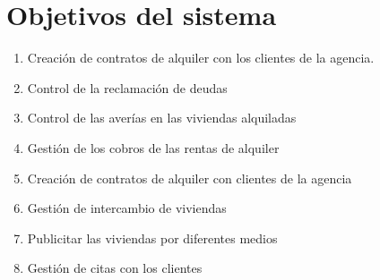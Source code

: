 \chapter{Objetivos del sistema} \label{Objetivos}
\begin{enumerate}
\item Creación de contratos de alquiler con los clientes de la agencia.

\item Control de la reclamación de deudas

\item Control de las averías en las viviendas alquiladas

\item Gestión de los cobros de las rentas de alquiler

\item Creación de contratos de alquiler con clientes de la agencia

\item Gestión de intercambio de viviendas

\item Publicitar las viviendas por diferentes medios

\item Gestión de citas con los clientes
\end{enumerate}